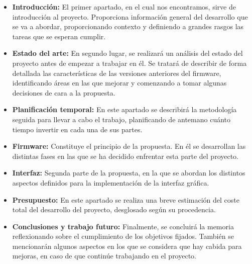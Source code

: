 \begin{itemize}
    \item\textbf{Introducción:} El primer apartado, en el cual nos encontramos, sirve de introducción al proyecto. Proporciona información general del desarrollo que se va a abordar, proporcionando contexto y definiendo a grandes rasgos las tareas que se esperan cumplir.
    \item\textbf{Estado del arte:} En segundo lugar, se realizará un análisis del estado del proyecto antes de empezar a trabajar en él. Se tratará de describir de forma detallada las características de las versiones anteriores del firmware, identificando áreas en las que mejorar y comenzando a tomar algunas decisiones de cara a la propuesta.
    \item\textbf{Planificación temporal:} En este apartado se describirá la metodología seguida para llevar a cabo el trabajo, planificando de antemano cuánto tiempo invertir en cada una de sus partes.
    \item\textbf{Firmware:} Constituye el principio de la propuesta. En él se desarrollan las distintas fases en las que se ha decidido enfrentar esta parte del proyecto.
    \item\textbf{Interfaz:} Segunda parte de la propuesta, en la que se abordan los distintos aspectos definidos para la implementación de la interfaz gráfica.
    \item\textbf{Presupuesto:} En este apartado se realiza una breve estimación del coste total del desarrollo del proyecto, desglosado según su procedencia.
    \item\textbf{Conclusiones y trabajo futuro:} Finalmente, se concluirá la memoria reflexionando sobre el cumplimiento de los objetivos fijados. También se mencionarán algunos aspectos en los que se considera que hay cabida para mejoras, en caso de que continúe trabajando en el proyecto.
\end{itemize}

